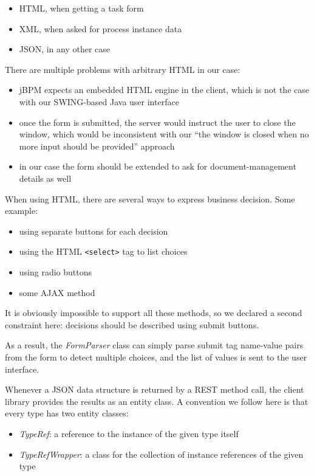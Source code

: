 \begin{itemize}
\item HTML, when getting a task form
\item XML, when asked for process instance data
\item JSON, in any other case
\end{itemize}

There are multiple problems with arbitrary HTML in our case:

\begin{itemize}
\item jBPM expects an embedded HTML engine in the client, which is not the case with our SWING-based Java user interface
\item once the form is submitted, the server would instruct the user to close
the window, which would be inconsistent with our ``the window is
closed when no more input should be provided'' approach
\item in our case the form should be extended to ask for document-management details as well
\end{itemize}

When using HTML, there are several ways to express business decision. Some example:

\begin{itemize}
\item using separate buttons for each decision
\item using the HTML \texttt{<select>} tag to list choices
\item using radio buttons
\item some AJAX method
\end{itemize}

It is obviously impossible to support all these methods, so we declared a
second constraint here: decisions should be described using submit buttons.

As a result, the \emph{FormParser} class can simply parse submit tag name-value
pairs from the form to detect multiple choices, and the list of values is sent
to the user interface.


Whenever a JSON data structure is returned by a REST method call, the client
library provides the results as an entity class. A convention we follow here is that every type has two entity classes:

\begin{itemize}
\item \emph{TypeRef}: a reference to the instance of the given type itself
\item \emph{TypeRefWrapper}: a class for the collection of instance references of the given type
\end{itemize}

